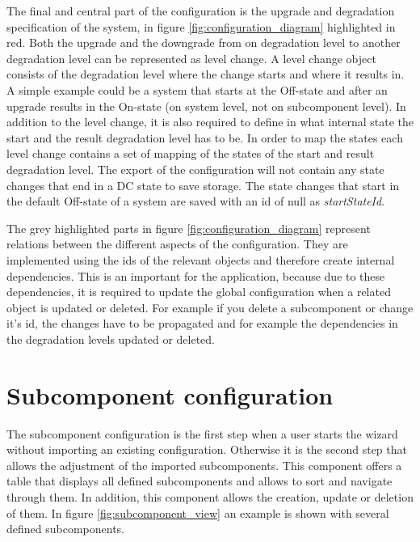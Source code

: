 The final and central part of the configuration is the upgrade and degradation specification of the system, in figure \ref{fig:configuration_diagram} highlighted in red. Both the upgrade and the downgrade from on degradation level to another degradation level can be represented as level change. A level change object consists of the degradation level where the change starts and where it results in. A simple example could be a system that starts at the Off-state and after an upgrade results in the On-state (on system level, not on subcomponent level). In addition to the level change, it is also required to define in what internal state the start and the result degradation level has to be. In order to map the states each level change contains a set of mapping of the states of the start and result degradation level. The export of the configuration will not contain any state changes that end in a DC state to save storage. The state changes that start in the default Off-state of a system are saved with an id of null as \textit{startStateId}.

The grey highlighted parts in figure \ref{fig:configuration_diagram} represent relations between the different aspects of the configuration. They are implemented using the ids of the relevant objects and therefore create internal dependencies. This is an important for the application, because due to these dependencies, it is required to update the global configuration when a related object is updated or deleted. For example if you delete a subcomponent or change it's id, the changes have to be propagated and for example the dependencies in the degradation levels updated or deleted.

\section{Subcomponent configuration}

The subcomponent configuration is the first step when a user starts the wizard without importing an existing configuration. Otherwise it is the second step that allows the adjustment of the imported subcomponents.
This component offers a table that displays all defined subcomponents and allows to sort and navigate through them. In addition, this component allows the creation, update or deletion of them. In figure \ref{fig:subcomponent_view} an example is shown with several defined subcomponents.

